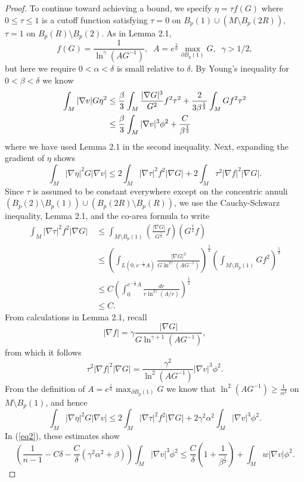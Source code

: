 \documentclass[10pt,a4paper]{amsart}
\begin{document}
\begin{proof}
To continue toward achieving a bound, we specify $\eta = \tau f(G)$ where $0\leq \tau \leq 1$ is a cutoff function satisfying $\tau = 0$ on $B_p(1)\cup (M\setminus B_p(2R)),$ $\tau = 1$ on $B_p(R)\setminus B_p(2)$. As in Lemma 2.1,
\begin{equation*}
f(G) = \frac{1}{\ln^\gamma(AG^{-1})}, \;\; A = e^{\frac{1}{\alpha}} \max_{\partial B_p(1)} G,\;\; \gamma>1/2,
\end{equation*}
but here we require $0<\alpha<\delta$ is small relative to $\delta$. By Young's inequality for $0<\beta<\delta$ we know
\begin{align}\label{eq3}
\int_M |\nabla v|G\eta ^2&\leq \frac{\beta}{3}\int_M\frac{|\nabla G|^3}{G^2}f^2\tau^2+\frac{2}{3\beta^\frac{1}{2}}\int_M Gf^2\tau^2 \notag\\
&\leq \frac{\beta}{3}\int_M |\nabla v|^3\phi^2+\frac{C}{\beta^\frac{1}{2}}
\end{align}
where we have used Lemma 2.1 in the second inequality. Next, expanding the gradient of $\eta$ shows
\begin{equation*}
\int_M |\nabla \eta|^2G|\nabla v|\leq 2\int_M|\nabla \tau|^2f^2|\nabla G|+2\int_M\tau^2|\nabla f|^2|\nabla G|.
\end{equation*}
Since $\tau$ is assumed to be constant everywhere except on the concentric annuli $(B_p(2)\setminus B_p(1))\cup (B_p(2R)\setminus B_p(R))$, we use the Cauchy-Schwarz inequality, Lemma 2.1, and the co-area formula to write
\begin{align*}
\int_M |\nabla \tau|^2f^2|\nabla G|\ 
&\leq \int_{M\setminus B_p(1)}\left(\frac{|\nabla G|}{G^\frac{1}{2}}f\right)\left(G^\frac{1}{2}f\right)\\
& \leq \left(\int_{L(0,e^{-\frac{1}{\alpha}}A)}\frac{|\nabla G|^2}{G\ln^{2\gamma}(AG^{-1})}\right)^\frac{1}{2}\left(\int_{M\setminus B_p(1)}Gf^2\right)^\frac{1}{2}\\
& \leq C\left(\int_0^{e^{-\frac{1}{\alpha}}A}\frac{dr}{r\ln^{2\gamma}(A/r)}\right)^\frac{1}{2}\\
& \leq C.
\end{align*}
From calculations in Lemma 2.1, recall
\begin{equation*}
|\nabla f| = \gamma \frac{|\nabla G|}{G\ln^{\gamma+1}(AG^{-1})},
\end{equation*}
from which it follows 
\begin{equation*}
\tau^2|\nabla f|^2|\nabla G| = \frac{\gamma^2}{\ln^2(AG^{-1})}|\nabla v|^3\phi^2.
\end{equation*}
From the definition of $A = e^\frac{1}{\alpha}\max_{\partial B_p(1)}G$ we know that $\ln^2(AG^{-1})\geq \frac{1}{\alpha^2}$ on $M\setminus B_p(1)$, and hence
\begin{equation*}
\int_M |\nabla \eta|^2G|\nabla v|\leq 2\int_M |\nabla\tau|^2f^2|\nabla G| +2\gamma^2\alpha^2\int_M |\nabla v|^3\phi^2 .
\end{equation*}
In (\ref{eq2}), these estimates show
\begin{equation*}
\left(\frac{1}{n-1}-C\delta-\frac{C}{\delta}\left(\gamma^2\alpha^2+\beta\right)\right)\int_M|\nabla v|^3\phi^2\leq \frac{C}{\delta}\left(1+\frac{1}{\beta^\frac{1}{2}}\right)+\int_M w|\nabla v| \phi^2.
\end{equation*}


\end{proof}
\end{document}
